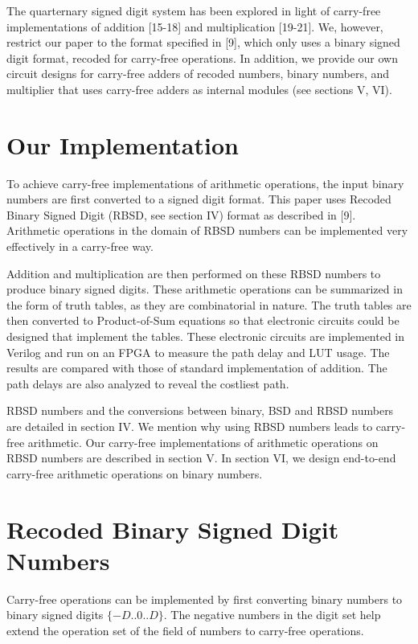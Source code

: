 \documentclass[conference]{IEEEtran_NCC}
\begin{document}
The quarternary signed digit system has been explored in light of carry-free implementations of addition [15-18] and multiplication [19-21]. We, however, restrict our paper to the format specified in [9], which only uses a binary signed digit format, recoded for carry-free operations. In addition, we provide our own circuit designs for carry-free adders of recoded numbers, binary numbers, and multiplier that uses carry-free adders as internal modules (see sections V, VI).


\section{Our Implementation}

To achieve carry-free implementations of arithmetic operations, the input binary numbers are first converted to a signed digit format. This paper uses Recoded Binary Signed Digit (RBSD, see section IV) format as described in [9]. Arithmetic operations in the domain of RBSD numbers can be implemented very effectively in a carry-free way.

Addition and multiplication are then performed on these RBSD numbers to produce binary signed digits. These arithmetic operations can be summarized in the form of truth tables, as they are combinatorial in nature. The truth tables are then converted to Product-of-Sum equations so that electronic circuits could be designed that implement the tables. These electronic circuits are implemented in Verilog and run on an FPGA to measure the path delay and LUT usage. The results are compared with those of standard implementation of addition. The path delays are also analyzed to reveal the costliest path.

RBSD numbers and the conversions between binary, BSD and RBSD numbers are detailed in section IV. We mention why using RBSD numbers leads to carry-free arithmetic. Our carry-free implementations of arithmetic operations on RBSD numbers are described in section V. In section VI, we design end-to-end carry-free arithmetic operations on binary numbers.


\section{Recoded Binary Signed Digit Numbers}

Carry-free operations can be implemented by first converting binary numbers to binary signed digits $\{-D..0..D\}$. The negative numbers in the digit set help extend the operation set of the field of numbers to carry-free operations.
\end{document}
